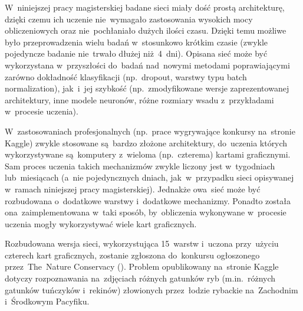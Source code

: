 W~niniejszej pracy magisterskiej badane sieci miały dość prostą architekturę, dzięki czemu ich uczenie nie~wymagało
zastosowania wysokich mocy obliczeniowych oraz nie~pochłaniało dużych ilości czasu. Dzięki temu możliwe było
przeprowadzenia wielu badań w~stosunkowo krótkim czasie (zwykle pojedyncze badanie nie~trwało dłużej niż~4~dni).
Opisana sieć może być wykorzystana w~przyszłości do~badań nad~nowymi metodami poprawiającymi zarówno dokładność
klasyfikacji (np.~dropout, warstwy typu batch normalization), jak~i~jej szybkość (np.~zmodyfikowane wersje
zaprezentowanej architektury, inne modele neuronów, różne rozmiary wsadu z~przykładami w~procesie uczenia).

W~zastosowaniach profesjonalnych (np.~prace wygrywające konkursy na~stronie Kaggle) zwykle stosowane są~bardzo złożone
architektury, do~uczenia których wykorzystywane są~komputery z~wieloma (np.~czterema) kartami graficznymi. Sam proces
uczenia takich mechanizmów zwykle liczony jest w~tygodniach lub~miesiącach (a~nie pojedyncznych dniach, jak~w~przypadku
sieci opisywanej w~ramach niniejszej pracy magisterskiej). Jednakże owa~sieć może być rozbudowana o~dodatkowe warstwy
i~dodatkowe mechanizmy. Ponadto została ona~zaimplementowana w~taki sposób, by~obliczenia wykonywane w~procesie uczenia
mogły wykorzystywać wiele kart graficznych.

Rozbudowana wersja sieci, wykorzystująca 15~warstw i~uczona przy~użyciu czterech kart graficznych, zostanie zgłoszona
do~konkursu ogłoszonego przez~The~Nature Conservacy (\cite{nature-conservacy}). Problem opublikowany na~stronie Kaggle
dotyczy rozpoznawania na~zdjęciach różnych gatunków ryb (m.in.~różnych gatunków tuńczyków i~rekinów) złowionych
przez~łodzie rybackie na~Zachodnim i~Środkowym Pacyfiku.